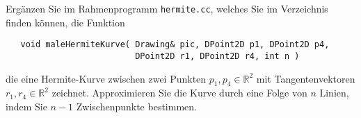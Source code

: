 \label{aufgabe:hermite}
%
Ergänzen Sie im Rahmenprogramm \texttt{hermite.cc}, welches Sie im 
Verzeichnis  finden können,
die Funktion
\begin{verbatim}
   void maleHermiteKurve( Drawing& pic, DPoint2D p1, DPoint2D p4,
                          DPoint2D r1, DPoint2D r4, int n )
\end{verbatim}
die eine Hermite-Kurve zwischen zwei Punkten $p_1, p_4 \in \mathbb{R}^2$ 
mit Tangentenvektoren $r_1, r_4 \in \mathbb{R}^2$ zeichnet. 
Approximieren Sie die Kurve durch eine Folge von $n$ Linien, indem Sie 
$n - 1$ Zwischenpunkte bestimmen.
